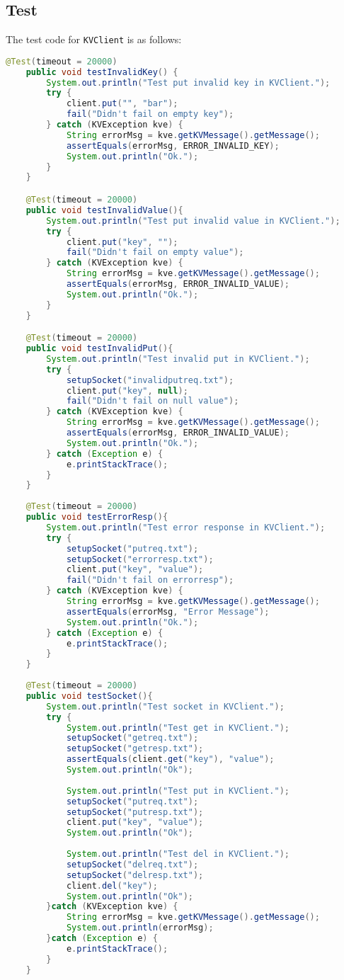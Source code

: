 \documentclass{article}
\begin{document}
\subsection{Test}
The test code for \texttt{KVClient} is as follows:
\begin{lstlisting}[language=java]
@Test(timeout = 20000)
    public void testInvalidKey() {
    	System.out.println("Test put invalid key in KVClient.");
        try {
            client.put("", "bar");
            fail("Didn't fail on empty key");
        } catch (KVException kve) {
            String errorMsg = kve.getKVMessage().getMessage();
            assertEquals(errorMsg, ERROR_INVALID_KEY);
            System.out.println("Ok.");
        }
    }

    @Test(timeout = 20000)
	public void testInvalidValue(){
    	System.out.println("Test put invalid value in KVClient.");
		try {
			client.put("key", "");
			fail("Didn't fail on empty value");
		} catch (KVException kve) {
			String errorMsg = kve.getKVMessage().getMessage();
			assertEquals(errorMsg, ERROR_INVALID_VALUE);
			System.out.println("Ok.");
		}
	}

    @Test(timeout = 20000)
	public void testInvalidPut(){
    	System.out.println("Test invalid put in KVClient.");
		try {
			setupSocket("invalidputreq.txt");
			client.put("key", null);
			fail("Didn't fail on null value");
		} catch (KVException kve) {
			String errorMsg = kve.getKVMessage().getMessage();
			assertEquals(errorMsg, ERROR_INVALID_VALUE);
			System.out.println("Ok.");
		} catch (Exception e) {
			e.printStackTrace();
		}
	}
    
    @Test(timeout = 20000)
	public void testErrorResp(){
    	System.out.println("Test error response in KVClient.");
		try {
			setupSocket("putreq.txt");
			setupSocket("errorresp.txt");
			client.put("key", "value");
			fail("Didn't fail on errorresp");
		} catch (KVException kve) {
			String errorMsg = kve.getKVMessage().getMessage();
			assertEquals(errorMsg, "Error Message");
			System.out.println("Ok.");
		} catch (Exception e) {
			e.printStackTrace();
		}
	}
    
    @Test(timeout = 20000)
    public void testSocket(){
    	System.out.println("Test socket in KVClient.");
    	try {
    		System.out.println("Test get in KVClient.");
    		setupSocket("getreq.txt");
    		setupSocket("getresp.txt");
    		assertEquals(client.get("key"), "value");
    		System.out.println("Ok");
    		
    		System.out.println("Test put in KVClient.");
    		setupSocket("putreq.txt");
    		setupSocket("putresp.txt");
    		client.put("key", "value");
    		System.out.println("Ok");
    		
    		System.out.println("Test del in KVClient.");
    		setupSocket("delreq.txt");
    		setupSocket("delresp.txt");
    		client.del("key");
    		System.out.println("Ok");
    	}catch (KVException kve) {
    		String errorMsg = kve.getKVMessage().getMessage();
    		System.out.println(errorMsg);
    	}catch (Exception e) {
    		e.printStackTrace();
    	}
    }
\end{lstlisting}
\end{document}
